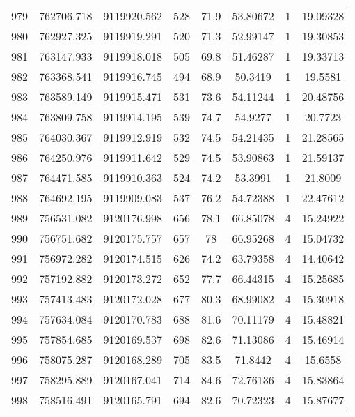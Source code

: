 \begin{longtable}{cccccccc}
979  & 762706.718      & 9119920.562      & 528     & 71.9  & 53.80672 & 1  & 19.09328 \\
980  & 762927.325      & 9119919.291      & 520     & 71.3  & 52.99147 & 1  & 19.30853 \\
981  & 763147.933      & 9119918.018      & 505     & 69.8  & 51.46287 & 1  & 19.33713 \\
982  & 763368.541      & 9119916.745      & 494     & 68.9  & 50.3419  & 1  & 19.5581  \\
983  & 763589.149      & 9119915.471      & 531     & 73.6  & 54.11244 & 1  & 20.48756 \\
984  & 763809.758      & 9119914.195      & 539     & 74.7  & 54.9277  & 1  & 20.7723  \\
985  & 764030.367      & 9119912.919      & 532     & 74.5  & 54.21435 & 1  & 21.28565 \\
986  & 764250.976      & 9119911.642      & 529     & 74.5  & 53.90863 & 1  & 21.59137 \\
987  & 764471.585      & 9119910.363      & 524     & 74.2  & 53.3991  & 1  & 21.8009  \\
988  & 764692.195      & 9119909.083      & 537     & 76.2  & 54.72388 & 1  & 22.47612 \\
989  & 756531.082      & 9120176.998      & 656     & 78.1  & 66.85078 & 4  & 15.24922 \\
990  & 756751.682      & 9120175.757      & 657     & 78    & 66.95268 & 4  & 15.04732 \\
991  & 756972.282      & 9120174.515      & 626     & 74.2  & 63.79358 & 4  & 14.40642 \\
992  & 757192.882      & 9120173.272      & 652     & 77.7  & 66.44315 & 4  & 15.25685 \\
993  & 757413.483      & 9120172.028      & 677     & 80.3  & 68.99082 & 4  & 15.30918 \\
994  & 757634.084      & 9120170.783      & 688     & 81.6  & 70.11179 & 4  & 15.48821 \\
995  & 757854.685      & 9120169.537      & 698     & 82.6  & 71.13086 & 4  & 15.46914 \\
996  & 758075.287      & 9120168.289      & 705     & 83.5  & 71.8442  & 4  & 15.6558  \\
997  & 758295.889      & 9120167.041      & 714     & 84.6  & 72.76136 & 4  & 15.83864 \\
998  & 758516.491      & 9120165.791      & 694     & 82.6  & 70.72323 & 4  & 15.87677 \\

\end{longtable}
